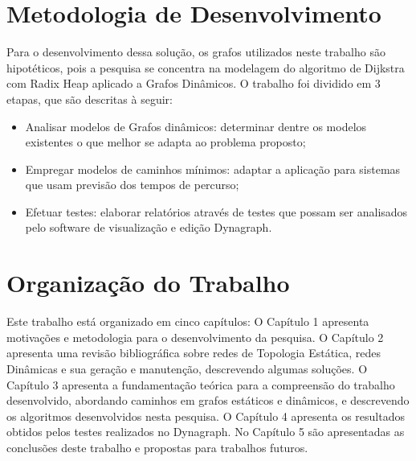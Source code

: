 \section{Metodologia de Desenvolvimento}

Para o desenvolvimento dessa solução, os grafos utilizados neste trabalho são hipotéticos,
pois a pesquisa se concentra na modelagem do algoritmo de Dijkstra com Radix Heap aplicado a Grafos Dinâmicos.
O trabalho foi dividido em 3 etapas, que são descritas à seguir:

\begin{itemize}
 \item Analisar modelos de Grafos dinâmicos: determinar dentre os modelos existentes o que melhor
 se adapta ao problema proposto;

 \item Empregar modelos de caminhos mínimos: adaptar a aplicação para sistemas que usam 
 previsão dos tempos de percurso;

 \item Efetuar testes: elaborar relatórios através de testes que possam ser analisados pelo
 software de visualização e edição Dynagraph.
\end{itemize}

\section{Organização do Trabalho}

Este trabalho está organizado em cinco capítulos:
O Capítulo 1 apresenta motivações e metodologia para o desenvolvimento da pesquisa.
O Capítulo 2 apresenta uma revisão bibliográfica sobre redes de Topologia Estática, redes Dinâmicas e
sua geração e manutenção, descrevendo algumas soluções.
O Capítulo 3 apresenta a fundamentação teórica para a compreensão do trabalho desenvolvido, abordando
caminhos em grafos estáticos e dinâmicos, e descrevendo os algoritmos desenvolvidos nesta pesquisa.
O Capítulo 4 apresenta os resultados obtidos pelos testes realizados no Dynagraph.
No Capítulo 5 são apresentadas as conclusões deste trabalho e propostas para trabalhos futuros.
